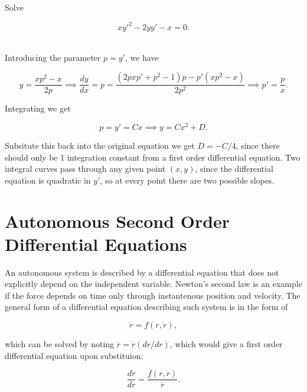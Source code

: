 \documentclass[english,a4paper,12pt]{report}
\begin{document}
{Solve 

\begin{equation}
    xy'^2-2yy'-x = 0.
\end{equation}
~
}
{Introducing the parameter \(p = y'\), we have 

\begin{equation}
    y = \frac{xp^2-x}{2p} \implies \frac{dy}{dx} = p = \frac{(2pxp'+p^2-1)p - p'(xp^2-x)}{2p^2} \implies p' = \frac{p}{x}.    
\end{equation}

Integrating we get 

\begin{equation}
    p = y' = Cx \implies y = Cx^2+D.
\end{equation}

Subsitute this back into the original equation we get \(D = -C /4\), since there should only be 1 integration constant from a first order differential equation. Two integral curves pass through any given point \((x,y)\), since the differential equation is quadratic in \(y'\), so at every point there are two possible slopes.
} 











\chapter{Autonomous Second Order Differential Equations}

An autonomous system is described by a differential equation that does not explicitly depend on the independent variable. Newton's second law is an example if the force depends on time only through instantenous position and velocity. The general form of a differential equation describing such system is in the form of 

\begin{equation}
    \ddot{r} = f(r,\dot{r} ),
\end{equation}

which can be solved by noting \(\ddot{r} = \dot{r} ( d \dot{r} /dr )  \), which would give a first order differential equation upon substituion:

\begin{equation}
    \frac{d \dot{r} }{dr} = \frac{f(r,\dot{r} )}{\dot{r} } .
\end{equation}
\end{document}
